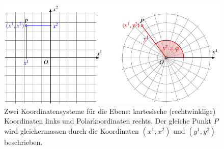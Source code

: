 %
%
%
\begin{figure}
\centering
\includegraphics{chapters/020-koordinaten/images/kartpolar.pdf}
\caption{Zwei Koordinatensysteme für die Ebene:
kartesische (rechtwinklige) Koordinaten links und Polarkoordinaten
rechts.
Der gleiche Punkt $P$ wird gleichermassen durch die Koordinaten 
$(x^1,x^2)$ und $(y^1,y^2)$ beschrieben.
\label{buch:koordinaten:fig:kartpolar}}
\end{figure}
